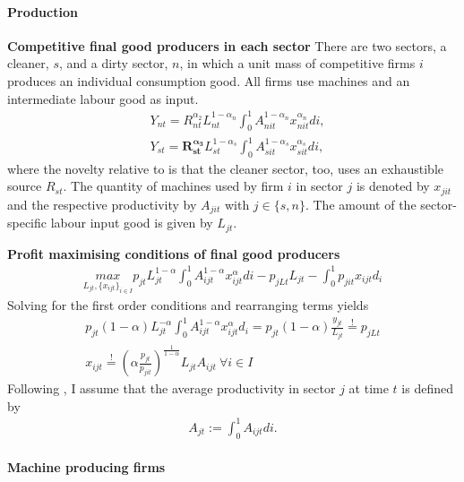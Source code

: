\documentclass[12pt]{article}
\begin{document}
\paragraph{Production}
\noindent\textbf{Competitive final good producers in each sector}
There are two sectors, a cleaner, $s$, and a dirty sector, $n$, in which a unit mass of competitive firms $i$ produces an individual consumption good. All firms use machines and an intermediate labour good as input. 
\begin{align*}
&Y_{nt}=R_{nt}^{\alpha_2} L_{nt}^{1-\alpha_n}\int_{0}^{1}A_{nit}^{1-\alpha_n}x_{nit}^{\alpha_n} di,\\
&Y_{st}=\pmb{R_{st}^{\alpha_3}} L_{st}^{1-\alpha_s}\int_{0}^{1}A_{sit}^{1-\alpha_s}x_{sit}^{\alpha_s} di, 
\end{align*}
where the novelty relative to \cite{Acemoglu2012TheChange} is that the cleaner sector, too, uses an exhaustible source $R_{st}$. 
The quantity of machines used by firm $i$ in sector $j$ is denoted by $x_{jit}$ and the respective productivity by $A_{jit}$ with $j\in\{s,n\}$. The amount of the sector-specific labour input good is given by $L_{jt}$.

\textbf{Profit maximising conditions of final good producers}
\begin{align*}
\underset{L_{jt}, \{x_{ijt}\}_{i \in I}}{max} p_{jt} L_{jt}^{1-\alpha} \int_{0}^{1}A_{ijt}^{1-\alpha}x_{ijt}^\alpha di - p_{jLt} L_{jt} - \int_{0}^{1} p_{jit}x_{ijt} d_i
\end{align*}
Solving for the first order conditions and rearranging terms yields
\begin{align}
p_{jt}(1-\alpha) L_{jt}^{-\alpha}\int_{0}^{1}A_{ijt}^{1-\alpha}x_{ijt}^\alpha d_i= p_{jt} (1-\alpha)\frac{y_{jt}}{L_{jt}}\overset{!}{=}p_{jLt}  \label{eq:foc_demand_L}
\\
x_{ijt} \overset{!}{=} \left(\alpha\frac{p_{jt}}{p_{jit}}\right)^\frac{1}{1-\alpha}L_{jt} A_{ijt}\ \forall i\in I \label{eq:foc_demand_ma}
\end{align}
Following \cite{Acemoglu2012TheChange}, I assume that the average productivity in sector $j$ at time $t$ is defined by
\begin{align*}
A_{jt}:=\int_{0}^{1}A_{ijt}di.
\end{align*}


\paragraph{Machine producing firms}
\end{document}

